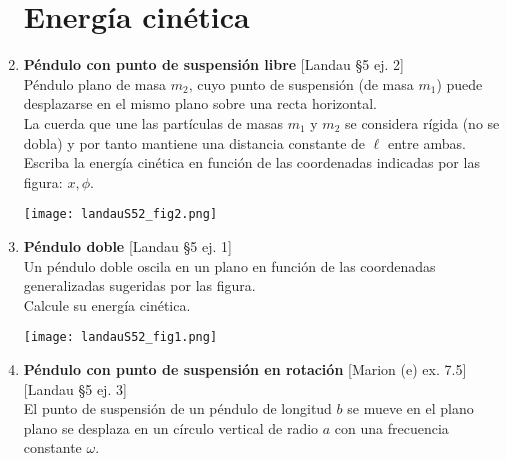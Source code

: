 \documentclass[11pt, spanish, a4paper, twoside]{article}
\begin{document}
\begin{enumerate}
	\section*{Energía cinética}

		\item
		\begin{minipage}[t][4cm]{0.6\textwidth}
			\textbf{Péndulo con punto de suspensión libre} [Landau \S5 ej. 2]\\
			Péndulo plano de masa \(m_2\), cuyo punto de suspensión (de masa \(m_1\)) puede desplazarse en el mismo plano sobre una recta horizontal.\\
			La cuerda que une las partículas de masas \(m_1\) y \(m_2\) se considera rígida (no se dobla) y por tanto mantiene una distancia constante de \(\ell\) entre ambas.\\
			Escriba la energía cinética en función de las coordenadas indicadas por las figura: \(x, \phi\).
		\end{minipage}
		\begin{minipage}[c][1cm][t]{0.35\textwidth}
			\texttt{[image: landauS52\_fig2.png]}
		\end{minipage}


		\item
			\begin{minipage}[t][4cm]{0.7\textwidth}
				\textbf{Péndulo doble} [Landau \S5 ej. 1]\\
				Un péndulo doble oscila en un plano en función de las coordenadas generalizadas sugeridas por las figura.\\
				Calcule su energía cinética.\\
			\end{minipage}
			\begin{minipage}[c][0.5cm][t]{0.3\textwidth}
				\texttt{[image: landauS52\_fig1.png]}
			\end{minipage}


		\item
			\begin{minipage}[t][7cm]{0.55\textwidth}
				\textbf{Péndulo con punto de suspensión en rotación} [Marion (e) ex. 7.5] [Landau \S5 ej. 3]\\
				El punto de suspensión de un péndulo de longitud \(b\) se mueve en el plano plano se desplaza en un círculo vertical de radio \(a\) con una frecuencia constante \(\omega\).


\end{minipage}
\end{enumerate}
\end{document}

